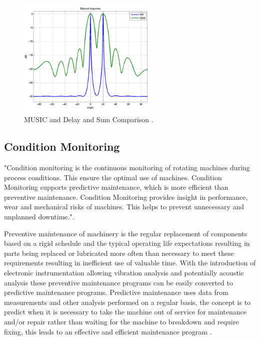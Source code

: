\documentclass{UoNMCHA}
\numberwithin{equation}{section}
\begin{document}
    \begin{figure}[H]
        \centering
        \includegraphics[keepaspectratio, width = 0.6\textwidth]{Figures/DASMUSICcomparison.png}
        \caption{MUSIC and Delay and Sum Comparison \citep{Nas12}.}
        \label{fig:das music comparison}
    \end{figure}
    
    \subsection{Condition Monitoring} \label{sec:Condition Monitoring}
    "Condition monitoring is the continuous monitoring of rotating machines during process conditions. This ensure the optimal use of machines. Condition Monitoring supports predictive maintenance, which is more efficient than preventive maintenance. Condition Monitoring provides insight in performance, wear and mechanical risks of machines. This helps to prevent unnecessary and unplanned downtime."\citep{Ist}.
    
    Preventive maintenance of machinery is the regular replacement of components based on a rigid schedule and the typical operating life expectations resulting in parts being replaced or lubricated more often than necessary to meet these requirements resulting in inefficient use of valuable time. With the introduction of electronic instrumentation allowing vibration analysis and potentially acoustic analysis these preventive maintenance programs can be easily converted to predictive maintenance programs. Predictive maintenance uses data from measurements and other analysis performed on a regular basis, the concept is to predict when it is necessary to take the machine out of service for maintenance and/or repair rather than waiting for the machine to breakdown and require fixing, this leads to an effective and efficient maintenance program \citep{Laws87}.
    
\end{document}
